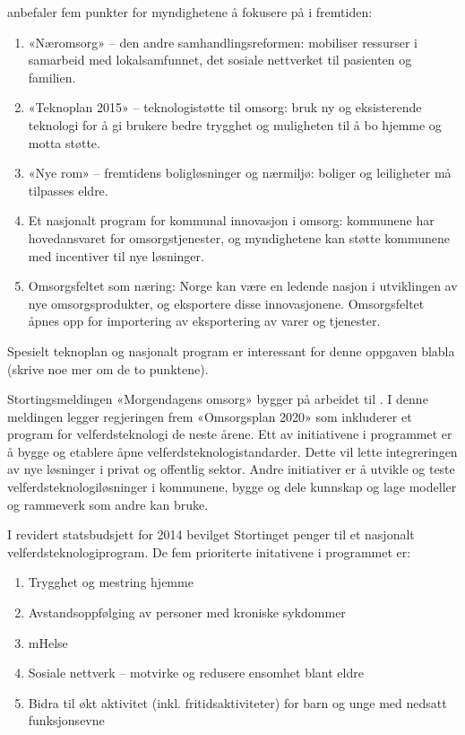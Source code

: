 \citet{regjeringen_hagen} anbefaler fem punkter for myndighetene å fokusere på i fremtiden:

\begin{enumerate}
    \item «Næromsorg» -- den andre samhandlingsreformen: mobiliser ressurser i samarbeid med
    lokalsamfunnet, det sosiale nettverket til pasienten og familien.
    \item «Teknoplan 2015» -- teknologistøtte til omsorg: bruk ny og eksisterende teknologi for å gi brukere
    bedre trygghet og muligheten til å bo hjemme og motta støtte.
    \item «Nye rom» -- fremtidens boligløsninger og nærmiljø: boliger og leiligheter må tilpasses eldre.
    \item Et nasjonalt program for kommunal innovasjon i omsorg: kommunene har hovedansvaret for omsorgstjenester,
    og myndighetene kan støtte kommunene med incentiver til nye løsninger.
    \item Omsorgsfeltet som næring: Norge kan være en ledende nasjon i utviklingen av nye omsorgsprodukter, og
    eksportere disse innovasjonene. Omsorgsfeltet åpnes opp for importering av eksportering av varer og tjenester.
\end{enumerate}

Spesielt teknoplan og nasjonalt program er interessant for denne oppgaven blabla (skrive noe mer om de to punktene).

Stortingsmeldingen «Morgendagens omsorg» bygger på arbeidet til \citet{regjeringen_hagen} \citep{morgendagens_omsorg}.
I denne meldingen legger regjeringen frem «Omsorgsplan 2020» som inkluderer et program for velferdsteknologi de neste årene.
Ett av initiativene i programmet er å bygge og etablere åpne velferdsteknologistandarder. Dette vil lette integreringen av nye
løsninger i privat og offentlig sektor. Andre initiativer er å utvikle og teste velferdsteknologiløsninger i kommunene,
bygge og dele kunnskap og lage modeller og rammeverk som andre kan bruke.

I revidert statsbudsjett for 2014 bevilget Stortinget penger til et nasjonalt velferdsteknologiprogram. De fem prioriterte
initativene i programmet er:

\begin{enumerate}
    \item Trygghet og mestring hjemme
    \item Avstandsoppfølging av personer med kroniske sykdommer
    \item mHelse
    \item Sosiale nettverk -- motvirke og redusere ensomhet blant eldre
    \item Bidra til økt aktivitet (inkl. fritidsaktiviteter) for barn og unge med nedsatt funksjonsevne
\end{enumerate}

